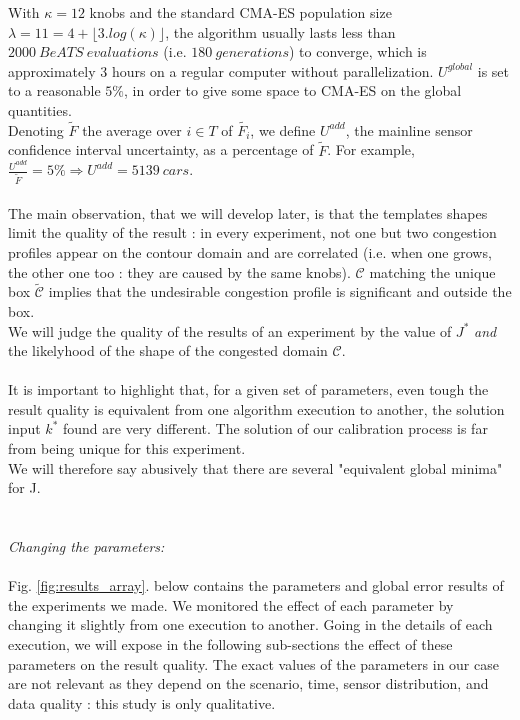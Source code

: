 With $\kappa=12$ knobs and the standard CMA-ES population size $\lambda=11=4+\lfloor3.log(\kappa)\rfloor$, the algorithm usually lasts less than $2000\ BeATS\ evaluations$ (i.e. $180\ generations$) to converge, which is  approximately 3 hours on a regular computer without parallelization.
$U^{global}$ is set to a reasonable $5\%$, in order to give some space to CMA-ES on the global quantities.\\
Denoting $\widetilde{F}$ the average over $i\in T$ of $\widetilde{F_{i}}$, we define $U^{add}$, the mainline sensor confidence interval uncertainty, as a percentage of $\widetilde{F}$. For example, $\frac{U^{add}}{\widetilde{F}}=5\% \Rightarrow U^{add}=5139\ cars$.\\
\\
The main observation, that we will develop later, is that the templates shapes limit the quality of the result : in every experiment, not one but two congestion profiles appear on the contour domain and are correlated (i.e. when one grows, the other one too : they are caused by the same knobs).  $\mathscr{C}$ matching the unique box $\widetilde{\mathscr{C}}$ implies that the undesirable congestion profile is significant and outside the box.\\
We will judge the quality of the results of an experiment by the value of $J^{*}$ \emph{and} the likelyhood of the shape of the congested domain $\mathscr{C}$. \\
\\
It is important to highlight that, for a given set of parameters, even tough the result quality is equivalent from one algorithm execution to another, the solution input $k^{*}$ found are very different. The solution of our calibration process is far from being unique for this experiment.\\
We will therefore say abusively that there are several "equivalent global minima" for J.\\
\\
\\
\emph{Changing the parameters:}\\
\\
Fig. \ref{fig:results_array}. below contains the parameters and global error results of the experiments we made. We monitored the effect of each parameter by changing it slightly from one execution to another. Going in the details of each execution, we will expose in the following sub-sections the effect of these parameters on the result quality. The exact values of the parameters in our case are not relevant as they depend on the scenario, time, sensor distribution, and data quality : this study is only qualitative. 
